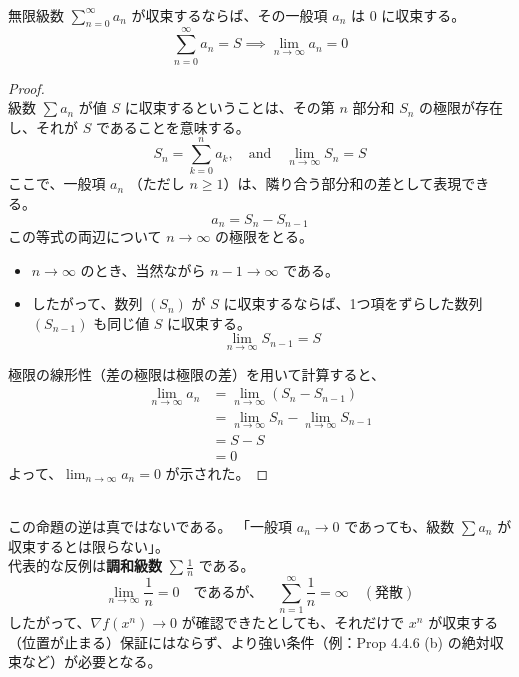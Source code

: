 \documentclass[dvipdfmx,a4paper,11pt]{jsarticle}
\begin{document}
\begin{prop}\ \\
  \noindent
    無限級数 $\displaystyle\sum_{n=0}^{\infty} a_n$ が収束するならば、その一般項 $a_n$ は $0$ に収束する。
    \[
    \sum_{n=0}^{\infty} a_n = S \implies \lim_{n \to \infty} a_n = 0
    \]
\end{prop}
\vspace{0.5em}
\begin{proof}\ \\
\noindent
級数 $\sum a_n$ が値 $S$ に収束するということは、その第 $n$ 部分和 $S_n$ の極限が存在し、それが $S$ であることを意味する。
\[
S_n = \sum_{k=0}^{n} a_k, \quad \text{and} \quad \lim_{n \to \infty} S_n = S
\]
ここで、一般項 $a_n$ （ただし $n \ge 1$）は、隣り合う部分和の差として表現できる。
\[
a_n = S_n - S_{n-1}
\]
この等式の両辺について $n \to \infty$ の極限をとる。
\begin{itemize}
    \item $n \to \infty$ のとき、当然ながら $n-1 \to \infty$ である。
    \item したがって、数列 $(S_n)$ が $S$ に収束するならば、1つ項をずらした数列 $(S_{n-1})$ も同じ値 $S$ に収束する。
    \[ \lim_{n \to \infty} S_{n-1} = S \]
\end{itemize}
極限の線形性（差の極限は極限の差）を用いて計算すると、
\begin{align*}
    \lim_{n \to \infty} a_n &= \lim_{n \to \infty} (S_n - S_{n-1}) \\
    &= \lim_{n \to \infty} S_n - \lim_{n \to \infty} S_{n-1} \\
    &= S - S \\
    &= 0
\end{align*}
よって、$\displaystyle\lim_{n \to \infty} a_n = 0$ が示された。
\end{proof}
\newpage
\begin{rem}\ \\
  \noindent
    この命題の逆は真ではないである。
    \ie 「一般項 $a_n \to 0$ であっても、級数 $\sum a_n$ が収束するとは限らない」。\\

    \noindent
    代表的な反例は\textbf{調和級数} $\sum \frac{1}{n}$ である。
    \[ \lim_{n \to \infty} \frac{1}{n} = 0 \quad \text{であるが、} \quad \sum_{n=1}^{\infty} \frac{1}{n} = \infty \quad (\text{発散}) \]
    したがって、$\nabla f(x^n) \to 0$ が確認できたとしても、それだけで $x^n$ が収束する（位置が止まる）保証にはならず、より強い条件（例：Prop 4.4.6 (b) の絶対収束など）が必要となる。
\end{rem}
\newpage
\end{document}
